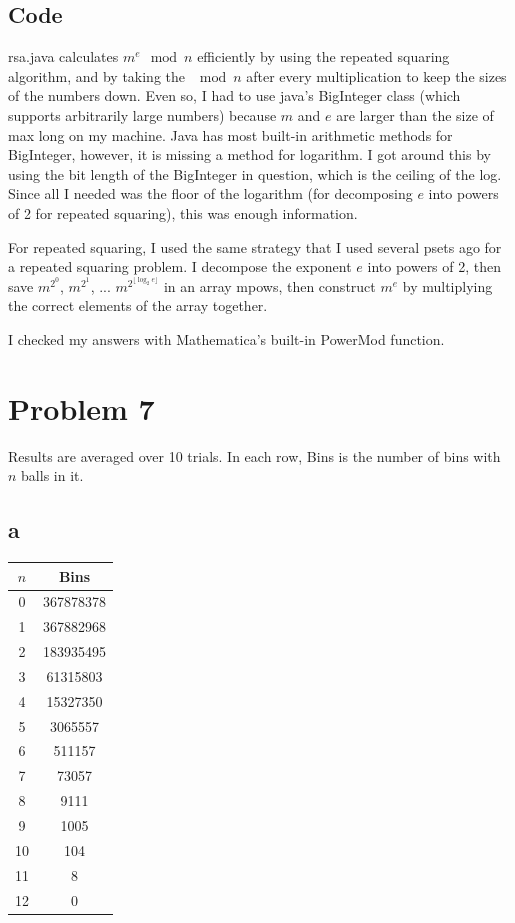 \documentclass{article}
\begin{document}
\subsection*{Code}
rsa.java calculates $m^e \mod n$ efficiently by using the repeated squaring algorithm, and by taking the $\mod n$ after every multiplication to keep the sizes of the numbers down. Even so, I had to use java's BigInteger class (which supports arbitrarily large numbers) because $m$ and $e$ are larger than the size of max long on my machine. Java has most built-in arithmetic methods for BigInteger, however, it is missing a method for logarithm. I got around this by using the bit length of the BigInteger in question, which is the ceiling of the log. Since all I needed was the floor of the logarithm (for decomposing $e$ into powers of 2 for repeated squaring), this was enough information.

For repeated squaring, I used the same strategy that I used several psets ago for a repeated squaring problem. I decompose the exponent $e$ into powers of 2, then save $m^{2^0}$, $m^{2^1}$, ... $m^{2^{\lfloor \log_2 e \rfloor}}$ in an array mpows, then construct $m^e$ by multiplying the correct elements of the array together. 

I checked my answers with Mathematica's built-in PowerMod function.

\section*{Problem 7}
Results are averaged over 10 trials. In each row, Bins is the number of bins with $n$ balls in it.
\subsection*{a} 
\begin{center}
\begin{tabular} { | c | c | }
\hline
$n$ & Bins\\

\hline\hline
0 & 367878378 \\
\hline
1 & 367882968 \\
\hline
2 & 183935495 \\
\hline 
3 &  61315803\\
\hline
4 & 15327350\\
\hline
5 & 3065557\\
\hline
6 & 511157\\
\hline
7 & 73057\\
\hline
8 & 9111\\
\hline
9 & 1005\\
\hline
10 & 104\\
\hline
11 & 8\\
\hline
12 & 0 \\
\hline
\end{tabular}
\end{center}
\end{document}
